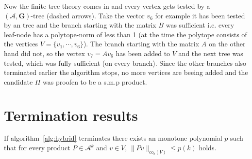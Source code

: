 Now the finite-tree theory comes in and every vertex gets tested by a $(\mathcal{A},\mathbf{G})\text{-tree}$ (dashed arrows). Take the vector $v_6$ for example it has been tested by an tree and the branch starting with the matrix $B$ was sufficient i.e. every leaf-node has a polytope-norm of less than 1 (at the time the polytope consists of the vertices $V = \{v_1, \cdots, v_6\}$). The branch starting with the matrix $A$ on the other hand did not, so the vertex $v_7 = Av_6$ has been added to $V$ and the next tree was tested, which was fully sufficient (on every branch). Since the other branches also terminated earlier the algorithm stops, no more vertices are beeing added and the candidate $\Pi$ was proofen to be a s.m.p product. 

\section{Termination results}

\begin{lemma}
  \label{lem:arb.prod.bound}
  If algorithm~\ref{alg:hybrid} terminates there exists an monotone polynomial $p$ such that for every product $P \in \mathcal{A}^k$ and $v \in V$, $\lVert Pv \rVert _{\text{co}_{\text{s}}(V)} \le p(k)$ holds.
\end{lemma}

